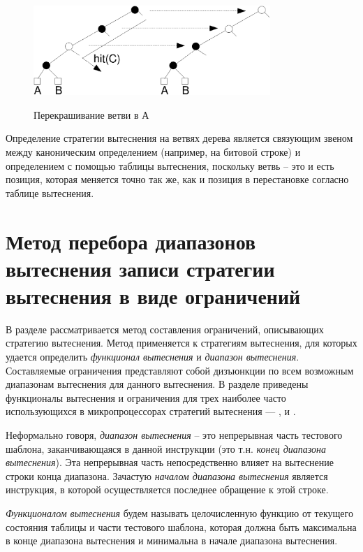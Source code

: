 \begin{figure}[h] \center
  \includegraphics[width=0.8\textwidth]{1.review/recolor}\\
  \caption{Перекрашивание ветви в А}\label{recolor}
\end{figure}


Определение стратегии вытеснения \PseudoLRU на ветвях дерева
является связующим звеном между каноническим определением (например,
на битовой строке) и определением с помощью таблицы вытеснения,
поскольку ветвь -- это и есть позиция, которая меняется точно так
же, как и позиция в перестановке согласно таблице вытеснения.

\section{Метод перебора диапазонов вытеснения записи стратегии
вытеснения в виде ограничений}\label{sec:diapazony}

{\footnotesize В разделе рассматривается метод составления ограничений,
описывающих стратегию вытеснения. Метод применяется к стратегиям вытеснения, для
которых удается определить \emph{функционал вытеснения} и \emph{диапазон
вытеснения}. Составляемые ограничения представляют собой дизъюнкции
по всем возможным диапазонам вытеснения для данного вытеснения. В разделе приведены функционалы вытеснения и ограничения для трех наиболее часто использующихся в микропроцессорах стратегий
вытеснения --- \LRU, \FIFO и \PseudoLRU}.

Неформально говоря, \emph{диапазон вытеснения} -- это непрерывная
часть тестового шаблона, заканчивающаяся в данной инструкции (это
т.н. \emph{конец диапазона вытеснения}). Эта непрерывная часть непосредственно
влияет на вытеснение строки конца диапазона.
Зачастую \emph{началом диапазона вытеснения} является инструкция, в
которой осуществляется последнее обращение к этой строке.

\emph{Функционалом вытеснения} будем называть целочисленную функцию от текущего
состояния таблицы и части тестового шаблона, которая должна быть
максимальна в конце диапазона вытеснения и минимальна в начале
диапазона вытеснения.

